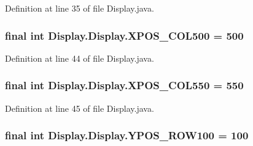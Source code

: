 Definition at line 35 of file Display.\+java.

\hypertarget{class_display_1_1_display_a8fafcc6bf1485ea9d420d3ec725472a7}{}
\subsubsection[{X\+P\+O\+S\+\_\+\+C\+O\+L500}]{\setlength{\rightskip}{0pt plus 5cm}final int Display.\+Display.\+X\+P\+O\+S\+\_\+\+C\+O\+L500 = 500\hspace{0.3cm}{\ttfamily [static]}}\label{class_display_1_1_display_a8fafcc6bf1485ea9d420d3ec725472a7}


Definition at line 44 of file Display.\+java.

\hypertarget{class_display_1_1_display_a50de34dab11aef2aa13d782d088deb7d}{}
\subsubsection[{X\+P\+O\+S\+\_\+\+C\+O\+L550}]{\setlength{\rightskip}{0pt plus 5cm}final int Display.\+Display.\+X\+P\+O\+S\+\_\+\+C\+O\+L550 = 550\hspace{0.3cm}{\ttfamily [static]}}\label{class_display_1_1_display_a50de34dab11aef2aa13d782d088deb7d}


Definition at line 45 of file Display.\+java.

\hypertarget{class_display_1_1_display_ab910e7da741fb624b211994905f5a1ec}{}
\subsubsection[{Y\+P\+O\+S\+\_\+\+R\+O\+W100}]{\setlength{\rightskip}{0pt plus 5cm}final int Display.\+Display.\+Y\+P\+O\+S\+\_\+\+R\+O\+W100 = 100\hspace{0.3cm}{\ttfamily [static]}}\label{class_display_1_1_display_ab910e7da741fb624b211994905f5a1ec}


